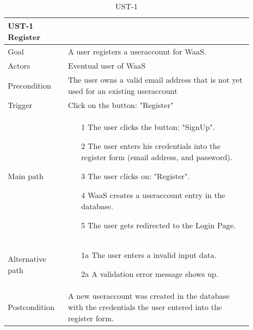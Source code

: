 \documentclass[titlepage, 12pt]{article}
\begin{document}
\begin{table}[H]
    \begin{center}

        \begin{tabular}{p{4cm}|p{10cm}}
            \textbf{UST-1 Register}\\
            \hline
            Goal & A user registers a useraccount for WaaS. \\
            \hline
            Actors & Eventual user of WaaS \\
            \hline
            Precondition  & The user owns a valid email address that is not yet used for an existing useraccount \\
            \hline
            Trigger & Click on the button: "Register" \\
            \hline
            Main path & 
            \begin{itemize}
                \item [1] The user clicks the button: "SignUp".
                \item [2] The user enters his credentials into the register form (email address, and password).
                \item [3] The user clicks on: "Register".
                \item [4] WaaS creates a useraccount entry in the database.
                \item [5] The user gets redirected to the Login Page.
            \end{itemize} \\
            \hline
            Alternative path & 
            \begin{itemize}
                \item [1a] The user enters a invalid input data.
                \item [2a] A validation error message shows up.
            \end{itemize} \\
            \hline
            Postcondition & A new useraccount was created in the database with the credentials the user entered into the register form. \\
        \end{tabular}

        \caption{UST-1}
    \label{table:UST-1}
        
    \end{center}
\end{table}
\end{document}
